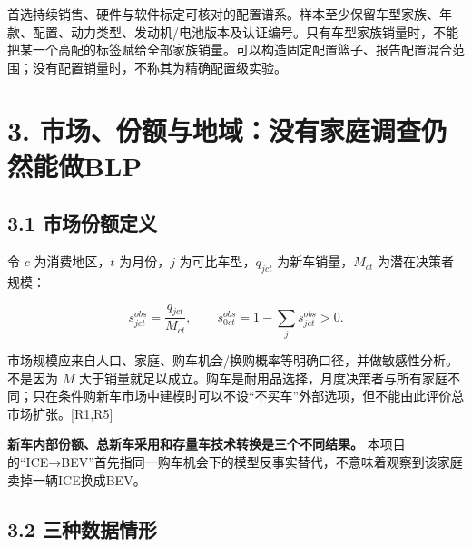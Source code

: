 \documentclass[
  11pt,
]{article}
\begin{document}
首选持续销售、硬件与软件标定可核对的配置谱系。样本至少保留车型家族、年款、配置、动力类型、发动机/电池版本及认证编号。只有车型家族销量时，不能把某一个高配的标签赋给全部家族销量。可以构造固定配置篮子、报告配置混合范围；没有配置销量时，不称其为精确配置级实验。

\section{3.
市场、份额与地域：没有家庭调查仍然能做BLP}\label{ux5e02ux573aux4efdux989dux4e0eux5730ux57dfux6ca1ux6709ux5bb6ux5eadux8c03ux67e5ux4ecdux7136ux80fdux505ablp}

\subsection{3.1
市场份额定义}\label{ux5e02ux573aux4efdux989dux5b9aux4e49}

令 \(c\) 为消费地区，\(t\) 为月份，\(j\) 为可比车型，\(q_{jct}\)
为新车销量，\(M_{ct}\) 为潜在决策者规模：

\[
s_{jct}^{obs}=\frac{q_{jct}}{M_{ct}},\qquad
s_{0ct}^{obs}=1-\sum_j s_{jct}^{obs}>0. \tag{4}
\]

市场规模应来自人口、家庭、购车机会/换购概率等明确口径，并做敏感性分析。不是因为
\(M\)
大于销量就足以成立。购车是耐用品选择，月度决策者与所有家庭不同；只在条件购新车市场中建模时可以不设``不买车''外部选项，但不能由此评价总市场扩张。{[}R1,R5{]}

\textbf{新车内部份额、总新车采用和存量车技术转换是三个不同结果。}
本项目的``ICE→BEV''首先指同一购车机会下的模型反事实替代，不意味着观察到该家庭卖掉一辆ICE换成BEV。

\subsection{3.2
三种数据情形}\label{ux4e09ux79cdux6570ux636eux60c5ux5f62}
\end{document}

